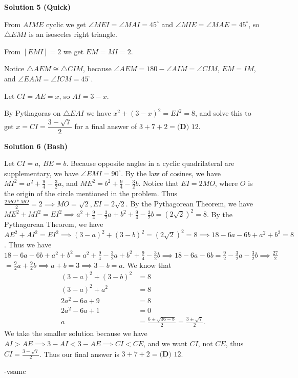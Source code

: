 \begin{enumerate}
 



\textbf{Solution 5 (Quick)}

From $AIME$ cyclic we get $\angle{MEI} = \angle{MAI} = 45^\circ$ and $\angle{MIE} = \angle{MAE} = 45^\circ$, so $\triangle{EMI}$ is an isosceles right triangle. 

 From $[EMI]=2$ we get $EM=MI=2$. 

 Notice $\triangle{AEM} \cong \triangle{CIM}$, because $\angle{AEM}=180-\angle{AIM}=\angle{CIM}$, $EM=IM$, and $\angle{EAM}=\angle{ICM}=45^\circ$. 

 Let $CI=AE=x$, so $AI=3-x$. 

 By Pythagoras on $\triangle{EAI}$ we have $x^2+(3-x)^2=EI^2=8$, and solve this to get $x=CI=\dfrac{3-\sqrt{7}}{2}$ for a final answer of $3+7+2=\boxed{\textbf{(D) }12}$.

 



\textbf{Solution 6 (Bash)}

Let $CI=a$, $BE=b$. Because opposite angles in a cyclic quadrilateral are supplementary, we have $\angle EMI=90^{\circ}$. By the law of cosines, we have $MI^2=a^2+\frac{9}{4}-\frac{3}{2}a$, and $ME^2=b^2+\frac{9}{4}-\frac{3}{2}b$. Notice that $EI=2MO$, where $O$ is the origin of the circle mentioned in the problem. Thus $\frac{2MO*MO}{2}=2\implies MO=\sqrt{2}, EI=2\sqrt{2}$. By the Pythagorean Theorem, we have $ME^2+MI^2=EI^2\implies a^2+\frac{9}{4}-\frac{3}{2}a+b^2+\frac{9}{4}-\frac{3}{2}b=(2\sqrt{2})^2=8$. By the Pythagorean Theorem, we have $AE^2+AI^2=EI^2\implies (3-a)^2+(3-b)^2=(2\sqrt{2})^2=8\implies 18-6a-6b+a^2+b^2=8$. Thus we have $18-6a-6b+a^2+b^2=a^2+\frac{9}{4}-\frac{3}{2}a+b^2+\frac{9}{4}-\frac{3}{2}b\implies 18-6a-6b=\frac{9}{2}-\frac{3}{2}a-\frac{3}{2}b\implies \frac{27}{2}$ $=\frac{9}{2}a+\frac{9}{2}b\implies a+b=3\implies 3-b=a$. We know that
 \begin{align*} (3-a)^2+(3-b)^2&=8 \\ (3-a)^2+a^2&=8 \\ 2a^2-6a+9&=8 \\ 2a^2-6a+1&=0 \\ a&=\frac{6\pm \sqrt{36-8}}{2}=\frac{3\pm\sqrt{7}}{2}. \end{align*}
We take the smaller solution because we have $AI>AE\implies 3-AI<3-AE\implies CI<CE$, and we want $CI$, not $CE$, thus $CI=\frac{3-\sqrt{7}}{2}$. Thus our final answer is $3+7+2=\boxed{\textbf{(D) }12}$.

 -vsamc


\end{enumerate}
